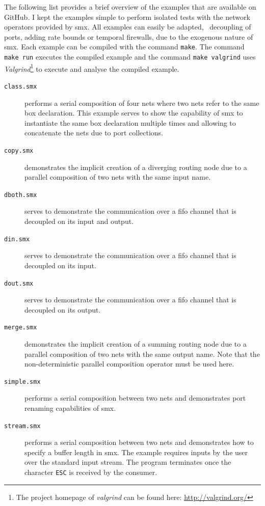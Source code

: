 The following list provides a brief overview of the examples that are available on GitHub.
I kept the examples simple to perform isolated tests with the network operators provided by \gls*{smx}.
All examples can easily be adapted, \eg~decoupling of ports, adding rate bounds or temporal firewalls, due to the exogenous nature of \gls*{smx}.
Each example can be compiled with the command \texttt{make}.
The command \texttt{make run} executes the compiled example and the command \texttt{make valgrind} uses \emph{Valgrind}\footnote{The project homepage of \emph{valgrind} can be found here: \url{http://valgrind.org/}} to execute and analyse the compiled example.

\begin{description}
    \item[\texttt{class.smx}] performs a serial composition of four nets where two nets refer to the same box declaration.
        This example serves to show the capability of \gls*{smx} to instantiate the same box declaration multiple times and allowing to concatenate the nets due to port collections.
    \item[\texttt{copy.smx}] demonstrates the implicit creation of a diverging routing node due to a parallel composition of two nets with the same input name.
    \item[\texttt{dboth.smx}] serves to demonstrate the communication over a \gls{fifo} channel that is decoupled on its input and output.
    \item[\texttt{din.smx}] serves to demonstrate the communication over a \gls{fifo} channel that is decoupled on its input.
    \item[\texttt{dout.smx}] serves to demonstrate the communication over a \gls{fifo} channel that is decoupled on its output.
    \item[\texttt{merge.smx}] demonstrates the implicit creation of a summing routing node due to a parallel composition of two nets with the same output name.
        Note that the non-deterministic parallel composition operator must be used here.
    \item[\texttt{simple.smx}] performs a serial composition between two nets and demonstrates port renaming capabilities of \gls*{smx}.
    \item[\texttt{stream.smx}] performs a serial composition between two nets and demonstrates how to specify a buffer length in \gls*{smx}.
        The example requires inputs by the user over the standard input stream.
        The program terminates once the character \texttt{ESC} is received by the consumer.

\end{description}
